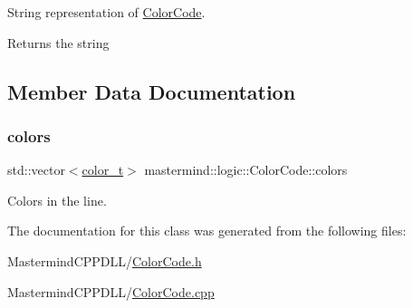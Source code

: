 String representation of \hyperlink{classmastermind_1_1logic_1_1_color_code}{Color\+Code}. 

\begin{DoxyReturn}{Returns}
the string 
\end{DoxyReturn}


\subsection{Member Data Documentation}
\hypertarget{classmastermind_1_1logic_1_1_color_code_a02a3b075035fe1fbc03140c745a30679}{}\label{classmastermind_1_1logic_1_1_color_code_a02a3b075035fe1fbc03140c745a30679} 
\subsubsection{\texorpdfstring{colors}{colors}}
{\footnotesize\ttfamily std\+::vector$<$\hyperlink{namespacemastermind_1_1logic_aab4e2166db8e8e5dcbed785c7927eca1}{color\+\_\+t}$>$ mastermind\+::logic\+::\+Color\+Code\+::colors\hspace{0.3cm}{\ttfamily [private]}}



Colors in the line. 



The documentation for this class was generated from the following files\+:\begin{DoxyCompactItemize}
\item 
Mastermind\+C\+P\+P\+D\+L\+L/\hyperlink{_color_code_8h}{Color\+Code.\+h}\item 
Mastermind\+C\+P\+P\+D\+L\+L/\hyperlink{_color_code_8cpp}{Color\+Code.\+cpp}\end{DoxyCompactItemize}
